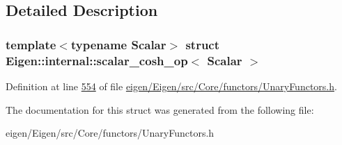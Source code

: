 \subsection{Detailed Description}
\subsubsection*{template$<$typename Scalar$>$\newline
struct Eigen\+::internal\+::scalar\+\_\+cosh\+\_\+op$<$ Scalar $>$}



Definition at line \hyperlink{eigen_2_eigen_2src_2_core_2functors_2_unary_functors_8h_source_l00554}{554} of file \hyperlink{eigen_2_eigen_2src_2_core_2functors_2_unary_functors_8h_source}{eigen/\+Eigen/src/\+Core/functors/\+Unary\+Functors.\+h}.



The documentation for this struct was generated from the following file\+:\begin{DoxyCompactItemize}
\item 
eigen/\+Eigen/src/\+Core/functors/\+Unary\+Functors.\+h\end{DoxyCompactItemize}

